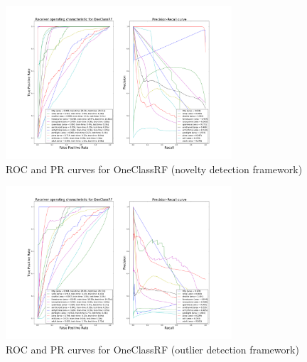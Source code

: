 

\begin{figure}[!ht]
    \caption{\acs{ROC} and \acs{PR} curves for \acs{OneClassRF} (novelty
    detection framework)}
    \label{ocrf:fig:oneclassrf_roc_pr}
    \centering
    \includegraphics[trim=175 80 175 123, clip,
    width=0.75\textwidth]{./gfx/bench_oneclassrf_roc_pr_supervised_factorized.png}
\end{figure}
\begin{figure}[!ht]
    \caption{\acs{ROC} and \acs{PR} curves for \acs{OneClassRF} (outlier
    detection framework)}
    \label{ocrf:fig:oneclassrf_roc_pr_unsupervised}
    \centering
    \includegraphics[trim=175 80 175 123, clip,
    width=0.75\textwidth]{./gfx/bench_oneclassrf_roc_pr_unsupervised_factorized.png}
\end{figure}
